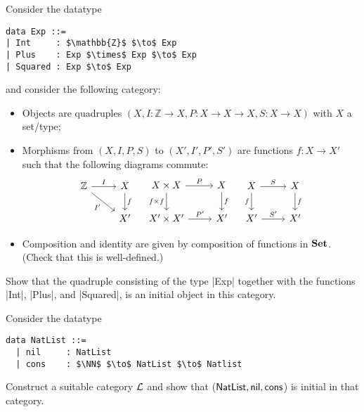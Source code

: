 \begin{exer}
  Consider the datatype
\begin{lstlisting}[mathescape=true]
data Exp ::=
| Int     : $\mathbb{Z}$ $\to$ Exp
| Plus    : Exp $\times$ Exp $\to$ Exp
| Squared : Exp $\to$ Exp
\end{lstlisting}
  and consider the following category:
  \begin{itemize}
  \item Objects are quadruples $(X, I : \mathbb{Z} \to X, P : X \to X \to X, S : X \to X)$ with $X$ a set/type;
  \item Morphisms from $(X, I, P, S)$ to $(X', I', P', S')$ are functions
    $f : X \to X'$ such that the following diagrams commute:
    \[
      \begin{tikzcd}
        \mathbb{Z} \ar[r, "I"] \ar[rd, "I'"']
        &
        X \ar[d, "f"]
        \\
        &
        X'
      \end{tikzcd}
      \quad
      \begin{tikzcd}
        X\times X \ar[r, "P"] \ar[d, "f \times f"']
        &
        X \ar[d, "f"]
        \\
        X' \times X' \ar[r, "P'"]
        &
        X'
      \end{tikzcd}
      \quad
      \begin{tikzcd}
        X \ar[r, "S"] \ar[d, "f"']
        &
        X \ar[d, "f"]
        \\
        X' \ar[r, "S'"]
        &
        X'
      \end{tikzcd}
    \]
  \item Composition and identity are given by composition of functions in $\mathbf{Set}$. (Check that this is well-defined.)
  \end{itemize}
  
    Show that the quadruple consisting of the type |Exp| together with the functions |Int|, |Plus|, and |Squared|, is an initial object in this category.
\end{exer}

\begin{exer}\label{exer:natlist_is_initial}
  Consider the datatype
  \begin{lstlisting}[mathescape=true]
  data NatList ::=
  | nil     : NatList
  | cons    : $\NN$ $\to$ NatList $\to$ Natlist
  \end{lstlisting}
  Construct a suitable category $\mathcal{L}$ and show that ($\mathsf{NatList}, \mathsf{nil}, \mathsf{cons}$) is initial in that category.
\end{exer}

